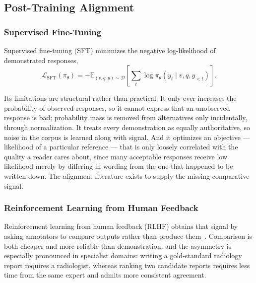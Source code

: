 \subsection{Post-Training Alignment}
\label{sec:bg:alignment}

\subsubsection{Supervised Fine-Tuning}

Supervised fine-tuning (SFT) minimizes the negative log-likelihood of demonstrated responses,
\begin{equation}\label{eq:sft}
\mathcal{L}_{\text{SFT}}(\pi_\theta) = -\mathbb{E}_{(v,q,y) \sim \mathcal{D}}\left[\sum_t \log \pi_\theta(y_t \mid v,q,y_{<t})\right].
\end{equation}

Its limitations are structural rather than practical. It only ever increases the probability of observed responses, so it cannot express that an unobserved response is bad; probability mass is removed from alternatives only incidentally, through normalization. It treats every demonstration as equally authoritative, so noise in the corpus is learned along with signal. And it optimizes an objective --- likelihood of a particular reference --- that is only loosely correlated with the quality a reader cares about, since many acceptable responses receive low likelihood merely by differing in wording from the one that happened to be written down. The alignment literature exists to supply the missing comparative signal.

\subsubsection{Reinforcement Learning from Human Feedback}

Reinforcement learning from human feedback (RLHF) obtains that signal by asking annotators to compare outputs rather than produce them~\cite{christiano2017deep, stiennon2020learning, ouyang2022training}. Comparison is both cheaper and more reliable than demonstration, and the asymmetry is especially pronounced in specialist domains: writing a gold-standard radiology report requires a radiologist, whereas ranking two candidate reports requires less time from the same expert and admits more consistent agreement.


